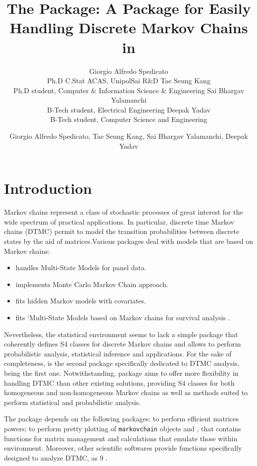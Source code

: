 \documentclass[article,nojss]{jss}
\author{
Giorgio Alfredo Spedicato\\Ph.D C.Stat ACAS, UnipolSai R\&D \And Tae Seung Kang\\Ph.D student, Computer \& Information Science \& Engineering \And Sai Bhargav Yalamanchi\\B-Tech student, Electrical Engineering \And Deepak Yadav\\B-Tech student, Computer Science and Engineering
}
\title{The \pkg{markovchain} Package: A Package for Easily Handling Discrete Markov Chains in \proglang{R}}
\author{Giorgio Alfredo Spedicato, Tae Seung Kang, Sai Bhargav Yalamanchi, Deepak Yadav}
\providecommand{\tightlist}{%
  \setlength{\itemsep}{0pt}\setlength{\parskip}{0pt}}
\begin{document}
\hypertarget{introduction}{%
\section{Introduction}\label{introduction}}

Markov chains represent a class of stochastic processes of great interest for the wide spectrum of practical applications. In particular, discrete time Markov chains (DTMC) permit to model the transition probabilities between discrete states by the aid of matrices.Various  packages deal with models that are based on Markov chains:

\begin{itemize}
\tightlist
\item
   \citep{msmR} handles Multi-State Models for panel data.
\item
   \citep{mcmcR} implements Monte Carlo Markov Chain approach.
\item
   \citep{hmmR} fits hidden Markov models with covariates.
\item
   fits `Multi-State Models based on Markov chains for survival analysis \citep{mstateR}.
\end{itemize}

Nevertheless, the  statistical environment \citep{rSoftware} seems to lack a simple package that coherently defines S4 classes for discrete Markov chains and allows to perform probabilistic analysis, statistical inference and applications. For the sake of completeness,  is the second package specifically dedicated to DTMC analysis, being  \citep{DTMCPackR} the first one. Notwithstanding,  package \citep{pkg:markovchain} aims to offer more flexibility in handling DTMC than other existing solutions, providing S4 classes for both homogeneous and non-homogeneous Markov chains as well as methods suited to perform statistical and probabilistic analysis.

The  package depends on the following  packages:  \citep{expmR} to perform efficient matrices powers;  \citep{pkg:igraph} to perform pretty plotting of \texttt{markovchain} objects and  \citep{pkg:matlab}, that contains functions for matrix management and calculations that emulate those within  environment. Moreover, other scientific softwares provide functions specifically designed to analyze DTMC, as  9 \citep{mathematica9}.
\end{document}
